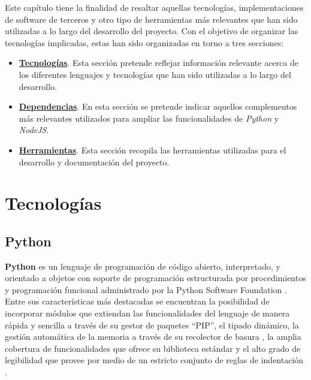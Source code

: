  \label{chapter:tecnicas_y_herramientas}

Este capítulo tiene la finalidad de resaltar aquellas tecnologías, implementaciones de software de terceros y otro tipo de herramientas más relevantes que han sido utilizadas a lo largo del desarrollo del proyecto. Con el objetivo de organizar las tecnologías implicadas, estas han sido organizadas en torno a tres secciones:

\vspace{-0.35cm}
\begin{itemize} [\textbullet]
	\item \hyperref[sec:tecnologias]{\textbf{Tecnologías}}. Esta sección pretende reflejar información relevante acerca de los diferentes lenguajes y tecnologías que han sido utilizadas a lo largo del desarrollo.
	\item \hyperref[sec:dependencias]{\textbf{Dependencias}}. En esta sección se pretende indicar aquellos complementos más relevantes utilizados para ampliar las funcionalidades de \emph{Python} y \emph{NodeJS}.
	\item \hyperref[sec:herramientas]{\textbf{Herramientas}}. Esta sección recopila las herramientas utilizadas para el desarrollo y documentación del proyecto.
\end{itemize}

\section{Tecnologías} \label{sec:tecnologias}

\subsection{Python}

\textbf{Python} \cite{lang:python} es un lenguaje de programación de código abierto, interpretado, y orientado a objetos con soporte de programación estructurada por procedimientos y programación funcional administrado por la Python Software Foundation \cite{tech:python_software_fundation}. Entre sus características más destacadas se encuentran la posibilidad de incorporar módulos que extiendan las funcionalidades del lenguaje de manera rápida y sencilla a través de su gestor de paquetes “PIP”, el tipado dinámico, la gestión automática de la memoria a través de su recolector de basura \cite{wiki:garbage_collection}, la amplia cobertura de funcionalidades que ofrece su biblioteca estándar y el alto grado de legibilidad que provee por medio de un estricto conjunto de reglas de indentación \cite{tech:advanced_python}.

